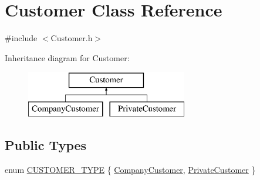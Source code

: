 \hypertarget{classCustomer}{}\section{Customer Class Reference}
\label{classCustomer}


{\ttfamily \#include $<$Customer.\+h$>$}

Inheritance diagram for Customer\+:\begin{figure}[H]
\begin{center}
\leavevmode
\includegraphics[height=2.000000cm]{classCustomer}
\end{center}
\end{figure}
\subsection*{Public Types}
\begin{DoxyCompactItemize}
\item 
enum \hyperlink{classCustomer_adf157cb713398bb38163743659ec3049}{C\+U\+S\+T\+O\+M\+E\+R\+\_\+\+T\+Y\+PE} \{ \hyperlink{classCustomer_adf157cb713398bb38163743659ec3049a6fd178caeb0cc24f8f4689d2d86de82b}{Company\+Customer}, 
\hyperlink{classCustomer_adf157cb713398bb38163743659ec3049a74cbae8b7e90efe986479e433ab9a840}{Private\+Customer}
 \}
\end{DoxyCompactItemize}
